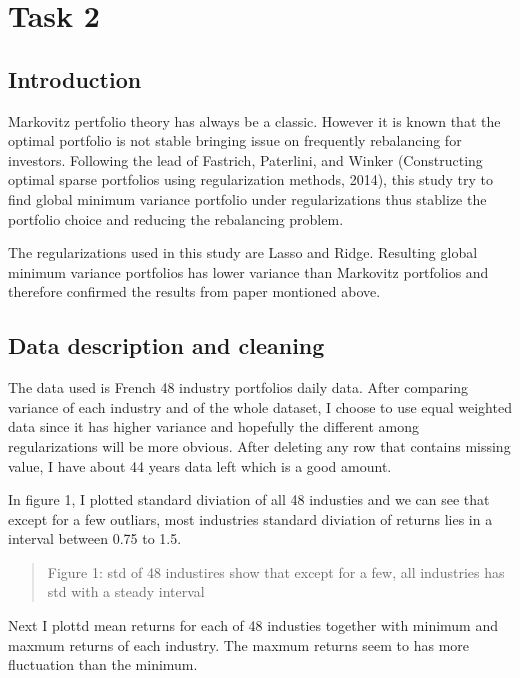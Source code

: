 \documentclass{article}
\newcommand{\ciapdf}[1]{\vspace*{-\parskip}\begin{center}\resizebox{0.75\textwidth}{!}{\texttt{[image: \#1]}}\end{center}}
\begin{document}
\section*{Task 2}

\subsection*{Introduction}

Markovitz pertfolio theory has always be a classic. However it is known that
the optimal portfolio is not stable bringing issue on frequently rebalancing
for investors. Following the lead of Fastrich, Paterlini, and Winker (Constructing
optimal sparse portfolios using regularization methods, 2014), this study
try to find global minimum variance portfolio under regularizations thus stablize
the portfolio choice and reducing the rebalancing problem.

The regularizations used in this study are Lasso and Ridge. Resulting global
minimum variance portfolios has lower variance than Markovitz portfolios and
therefore confirmed the results from paper montioned above.

\subsection*{Data description and cleaning}

The data used is French 48 industry portfolios daily data. After comparing variance
of each industry and of the whole dataset, I choose to use equal weighted data
since it has higher variance and hopefully the different among regularizations
will be more obvious. After deleting any row that contains missing value, I have
about 44 years data left which is a good amount.

In figure 1, I plotted standard diviation of all 48 industies and we can see that
except for a few outliars, most industries standard diviation of returns lies
in a interval between 0.75 to 1.5.

\ciapdf{Figure_1T2.pdf}

\begin{quote}
Figure 1: std of 48 industires show that except for a few, all industries has
std with a steady interval
\end{quote}

Next I plottd mean returns for each of 48 industies together with minimum and maxmum
returns of each industry. The maxmum returns seem to has more fluctuation than
the minimum.
\end{document}

